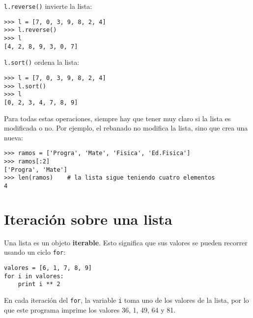 \lstinline!l.reverse()! invierte la lista:

\begin{lstlisting}
>>> l = [7, 0, 3, 9, 8, 2, 4]
>>> l.reverse()
>>> l
[4, 2, 8, 9, 3, 0, 7]
\end{lstlisting}

\lstinline!l.sort()! ordena la lista:

\begin{lstlisting}
>>> l = [7, 0, 3, 9, 8, 2, 4]
>>> l.sort()
>>> l
[0, 2, 3, 4, 7, 8, 9]
\end{lstlisting}

Para todas estas operaciones, siempre hay que tener muy claro si la
lista es modificada o no. Por ejemplo, el rebanado no modifica la lista,
sino que crea una nueva:

\begin{lstlisting}
>>> ramos = ['Progra', 'Mate', 'Fisica', 'Ed.Fisica']
>>> ramos[:2]
['Progra', 'Mate']
>>> len(ramos)    # la lista sigue teniendo cuatro elementos
4
\end{lstlisting}

\section{Iteración sobre una lista}

Una lista es un objeto \textbf{iterable}. Esto significa que sus valores
se pueden recorrer usando un ciclo \lstinline!for!:

\begin{lstlisting}
valores = [6, 1, 7, 8, 9]
for i in valores:
    print i ** 2
\end{lstlisting}

En cada iteración del \lstinline!for!, la variable \lstinline!i! toma
uno de los valores de la lista, por lo que este programa imprime los valores
36,
1,
49,
64 y
81.
